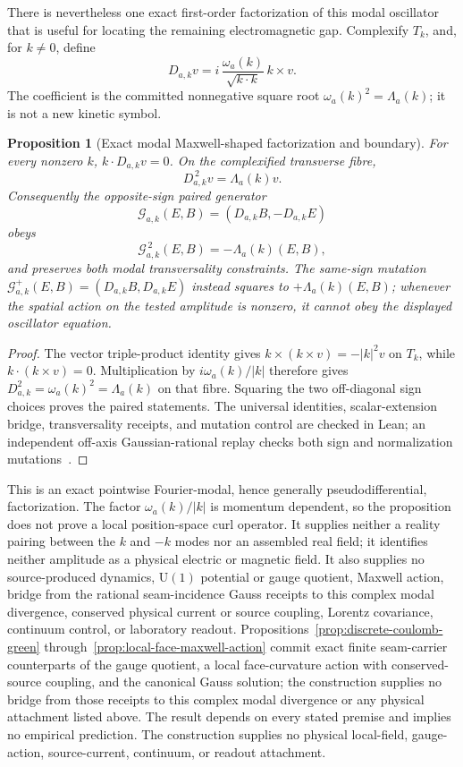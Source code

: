 \documentclass[11pt]{article}
\newtheorem{proposition}[theorem]{Proposition}
\theoremstyle{remark}
\theoremstyle{plain}
\begin{document}
There is nevertheless one exact first-order factorization of this modal
oscillator that is useful for locating the remaining electromagnetic gap.
Complexify \(T_k\), and, for \(k\ne0\), define
\[
 D_{a,k}v
 =i\,\frac{\omega_a(k)}{\sqrt{k\mathbin{\cdot}k}}\,k\mathbin{\times}v.
\]
The coefficient is the committed nonnegative square root
\(\omega_a(k)^2=\Lambda_a(k)\); it is not a new kinetic symbol.

\begin{proposition}[Exact modal Maxwell-shaped factorization and boundary]
\label{prop:modal-maxwell-factorization-boundary}
For every nonzero \(k\), \(k\mathbin{\cdot}D_{a,k}v=0\).  On the complexified
transverse fibre,
\[
 D_{a,k}^{\,2}v=\Lambda_a(k)v.
\]
Consequently the opposite-sign paired generator
\[
 \mathcal G_{a,k}(E,B)=(D_{a,k}B,-D_{a,k}E)
\]
obeys
\[
 \mathcal G_{a,k}^{\,2}(E,B)
   =-\Lambda_a(k)(E,B),
\]
and preserves both modal transversality constraints.  The same-sign mutation
\(\mathcal G^+_{a,k}(E,B)=(D_{a,k}B,D_{a,k}E)\) instead squares to
\(+\Lambda_a(k)(E,B)\); whenever the spatial action on the tested amplitude
is nonzero, it cannot obey the displayed oscillator equation.
\end{proposition}

\begin{proof}
The vector triple-product identity gives
\(k\times(k\times v)=-|k|^2v\) on \(T_k\), while
\(k\cdot(k\times v)=0\). Multiplication by \(i\omega_a(k)/|k|\) therefore gives
\(D_{a,k}^2=\omega_a(k)^2=\Lambda_a(k)\) on that fibre. Squaring the two
off-diagonal sign choices proves the paired statements.  The universal
identities, scalar-extension bridge, transversality receipts, and mutation
control are checked in Lean; an independent off-axis Gaussian-rational replay
checks both sign and normalization mutations~\cite{ophrepo}.
\end{proof}

This is an exact pointwise Fourier-modal, hence generally
pseudodifferential, factorization.  The factor
\(\omega_a(k)/|k|\) is momentum dependent, so the proposition does not prove
a local position-space curl operator.  It supplies neither a reality pairing
between the \(k\) and \(-k\) modes nor an assembled real field; it identifies
neither amplitude as a physical electric or magnetic field.  It also supplies
no source-produced dynamics, \(\mathrm U(1)\) potential or gauge quotient,
Maxwell action, bridge from the rational seam-incidence Gauss receipts to this
complex modal divergence, conserved physical current or source coupling,
Lorentz covariance, continuum control, or laboratory readout.
Propositions~\ref{prop:discrete-coulomb-green}
through~\ref{prop:local-face-maxwell-action} commit exact finite
seam-carrier counterparts of the gauge quotient, a local face-curvature
action with conserved-source coupling, and the canonical Gauss solution; the
construction supplies no bridge from those receipts to this complex modal
divergence or any physical attachment listed above. The result depends on
every stated premise and implies no empirical prediction. The construction supplies
no physical local-field, gauge-action, source-current, continuum, or readout
attachment.
\end{document}
